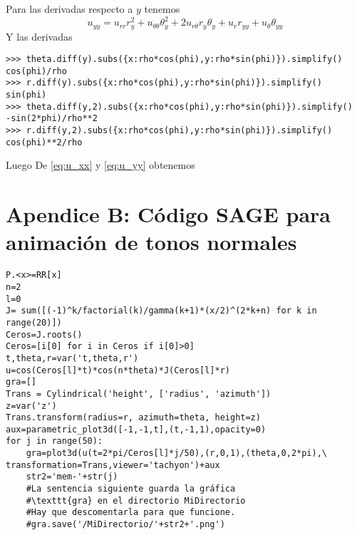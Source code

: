 Para las derivadas respecto a $y$ tenemos
\[u_{yy}=u_{rr}r_y^2+u_{\theta\theta}\theta_y^2+2u_{r\theta}r_y\theta_y+u_rr_{yy}+u_{\theta}\theta_{yy}\]
Y las derivadas
 \begin{lstlisting}
>>> theta.diff(y).subs({x:rho*cos(phi),y:rho*sin(phi)}).simplify()
cos(phi)/rho
>>> r.diff(y).subs({x:rho*cos(phi),y:rho*sin(phi)}).simplify()
sin(phi)
>>> theta.diff(y,2).subs({x:rho*cos(phi),y:rho*sin(phi)}).simplify()
-sin(2*phi)/rho**2
>>> r.diff(y,2).subs({x:rho*cos(phi),y:rho*sin(phi)}).simplify()
cos(phi)**2/rho
\end{lstlisting}
Luego
De \eqref{eq:u_xx} y \eqref{eq:u_yy} obtenemos


\section{Apendice B: Código SAGE para animación de  tonos normales}\label{apendiceB}

\begin{lstlisting}
P.<x>=RR[x]
n=2
l=0
J= sum([(-1)^k/factorial(k)/gamma(k+1)*(x/2)^(2*k+n) for k in range(20)])
Ceros=J.roots()
Ceros=[i[0] for i in Ceros if i[0]>0]
t,theta,r=var('t,theta,r')
u=cos(Ceros[l]*t)*cos(n*theta)*J(Ceros[l]*r)
gra=[]
Trans = Cylindrical('height', ['radius', 'azimuth'])
z=var('z')
Trans.transform(radius=r, azimuth=theta, height=z)
aux=parametric_plot3d([-1,-1,t],(t,-1,1),opacity=0)
for j in range(50):
    gra=plot3d(u(t=2*pi/Ceros[l]*j/50),(r,0,1),(theta,0,2*pi),\
transformation=Trans,viewer='tachyon')+aux
    str2='mem-'+str(j)
    #La sentencia siguiente guarda la gráfica 
    #\texttt{gra} en el directorio MiDirectorio
    #Hay que descomentarla para que funcione.
    #gra.save('/MiDirectorio/'+str2+'.png')

\end{lstlisting}

 

%
